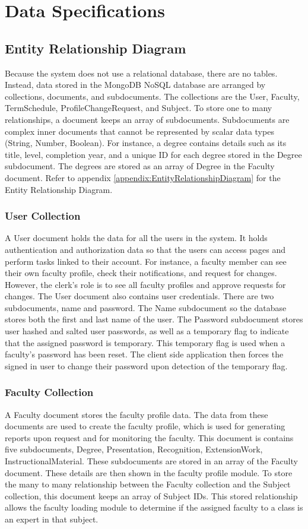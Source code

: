 \section{Data Specifications}

\subsection{Entity Relationship Diagram}
Because the system does not use a relational database, there are no tables. Instead, data stored in the MongoDB NoSQL database are arranged by collections, documents, and subdocuments. The collections are the User, Faculty, TermSchedule, ProfileChangeRequest, and Subject. To store one to many relationships, a document keeps an array of subdocuments. Subdocuments are complex inner documents that cannot be represented by scalar data types (String, Number, Boolean). For instance, a degree contains details such as its title, level, completion year, and a unique ID for each degree stored in the Degree subdocument. The degrees are stored as an array of Degree in the Faculty document. Refer to appendix \ref{appendix:EntityRelationshipDiagram} for the Entity Relationship Diagram.

\subsubsection{User Collection}
A User document holds the data for all the users in the system. It holds authentication and authorization data so that the users can access pages and perform tasks linked to their account. For instance, a faculty member can see their own faculty profile, check their notifications, and request for changes. However, the clerk's role is to see all faculty profiles and approve requests for changes. The User document also contains user credentials. There are two subdocuments, name and password. The Name subdocument so the database stores both the first and last name of the user. The Password subdocument stores user hashed and salted user passwords, as well as a temporary flag to indicate that the assigned password is temporary. This temporary flag is used when a faculty's password has been reset. The client side application then forces the signed in user to change their password upon detection of the temporary flag.

\subsubsection{Faculty Collection}
A Faculty document stores the faculty profile data. The data from these documents are used to create the faculty profile, which is used for generating reports upon request and for monitoring the faculty. This document is contains five subdocuments, Degree, Presentation, Recognition, ExtensionWork, InstructionalMaterial. These subdocuments are stored in an array of the Faculty document. These details are then shown in the faculty profile module. To store the many to many relationship between the Faculty collection and the Subject collection, this document keeps an array of Subject IDs. This stored relationship allows the faculty loading module to determine if the assigned faculty to a class is an expert in that subject.

